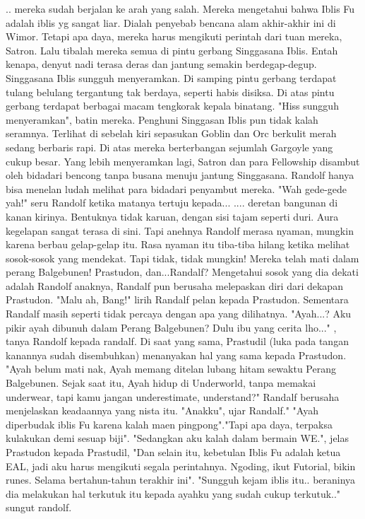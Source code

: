 \documentclass[a4paper,11pt,final]{article}
\begin{document}
.. mereka sudah berjalan ke arah yang salah. Mereka mengetahui bahwa Iblis Fu adalah iblis yg sangat liar. Dialah penyebab bencana alam akhir-akhir ini di Wimor. Tetapi apa daya, mereka harus mengikuti perintah dari tuan mereka, Satron.
Lalu tibalah mereka semua di pintu gerbang Singgasana Iblis. Entah kenapa, denyut nadi terasa deras dan jantung semakin berdegap-degup.
Singgasana Iblis sungguh menyeramkan. Di samping pintu gerbang terdapat tulang belulang tergantung tak berdaya, seperti habis disiksa. Di atas pintu gerbang terdapat berbagai macam tengkorak kepala binatang. "Hiss sungguh menyeramkan", batin mereka.
Penghuni Singgasan Iblis pun tidak kalah seramnya. Terlihat di sebelah kiri sepasukan Goblin dan Orc berkulit merah sedang berbaris rapi. Di atas mereka berterbangan sejumlah Gargoyle yang cukup besar.
Yang lebih menyeramkan lagi, Satron dan para Fellowship disambut oleh bidadari bencong tanpa busana menuju jantung Singgasana.
Randolf hanya bisa menelan ludah melihat para bidadari penyambut mereka. "Wah gede-gede yah!" seru Randolf ketika matanya tertuju kepada...
.... deretan bangunan di kanan kirinya. Bentuknya tidak karuan, dengan sisi tajam seperti duri. Aura kegelapan sangat terasa di sini. Tapi anehnya Randolf merasa nyaman, mungkin karena berbau gelap-gelap itu.
Rasa nyaman itu tiba-tiba hilang ketika melihat sosok-sosok yang mendekat. Tapi tidak, tidak mungkin! Mereka telah mati dalam perang Balgebunen! Prastudon, dan...Randalf?
Mengetahui sosok yang dia dekati adalah Randolf anaknya, Randalf pun berusaha melepaskan diri dari dekapan Prastudon. "Malu ah, Bang!" lirih Randalf pelan kepada Prastudon. Sementara Randalf masih seperti tidak percaya dengan apa yang dilihatnya.
"Ayah...? Aku pikir ayah dibunuh dalam Perang Balgebunen? Dulu ibu yang cerita lho..." , tanya Randolf kepada randalf. Di saat yang sama, Prastudil (luka pada tangan kanannya sudah disembuhkan) menanyakan hal yang sama kepada Prastudon.
"Ayah belum mati nak, Ayah memang ditelan lubang hitam sewaktu Perang Balgebunen. Sejak saat itu, Ayah hidup di Underworld, tanpa memakai underwear, tapi kamu jangan underestimate, understand?" Randalf berusaha menjelaskan keadaannya yang nista itu.
"Anakku", ujar Randalf." "Ayah diperbudak iblis Fu karena kalah maen pingpong"."Tapi apa daya, terpaksa kulakukan demi sesuap biji".
"Sedangkan aku kalah dalam bermain WE.", jelas Prastudon kepada Prastudil, "Dan selain itu, kebetulan Iblis Fu adalah ketua EAL, jadi aku harus mengikuti segala perintahnya. Ngoding, ikut Futorial, bikin runes. Selama bertahun-tahun terakhir ini".
"Sungguh kejam iblis itu.. beraninya dia melakukan hal terkutuk itu kepada ayahku yang sudah cukup terkutuk.." sungut randolf.
\end{document}
